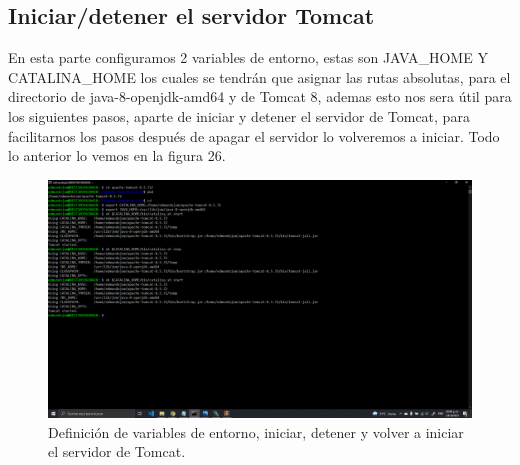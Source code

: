 \documentclass[11pt]{article}
\begin{document}
		\subsection{Iniciar/detener el servidor Tomcat}
		En esta parte configuramos 2 variables de entorno, estas son JAVA\_HOME Y CATALINA\_HOME los cuales se tendrán que asignar las rutas absolutas, para el directorio de java-8-openjdk-amd64 y de Tomcat 8, ademas esto nos sera útil para los siguientes pasos, aparte de iniciar y detener el servidor de Tomcat, para facilitarnos los pasos después de apagar el servidor lo volveremos a iniciar. Todo lo anterior lo vemos en la figura 26.
		\begin{figure}[H]
			\centering
			\includegraphics[scale=0.34]{resources/iniciandotomcat.png}
			\caption{Definición de variables de entorno, iniciar, detener y volver a iniciar el servidor de Tomcat.}\label{fig:picture}
		\end{figure}
\end{document}
